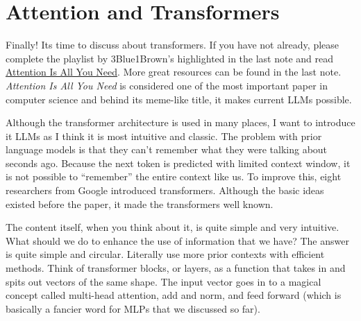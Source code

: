 \documentclass[../../../main.tex]{subfiles}
\begin{document}
\section{Attention and Transformers}

Finally! Its time to discuss about transformers. If you have not
already, please complete the playlist by 3Blue1Brown's highlighted
in the last note and read \href{https://arxiv.org/abs/1706.03762}
{Attention Is All You Need}. More great resources can be found in
the last note. \textit{Attention Is All You Need} is considered one
of the most important paper in computer science and behind its
meme-like title, it makes current LLMs possible.

Although the transformer architecture is used in many places, I want
to introduce it LLMs as I think it is most intuitive and classic.
The problem with prior language models is that they can't remember
what they were talking about seconds ago. Because the next token
is predicted with limited context window, it is not possible to
``remember'' the entire context like us. To improve this, eight
researchers from Google introduced transformers. Although the basic
ideas existed before the paper, it made the transformers well known.

The content itself, when you think about it, is quite simple and
very intuitive. What should we do to enhance the use of information
that we have? The answer is quite simple and circular. Literally use
more prior contexts with efficient methods. Think of transformer
blocks, or layers, as a function that takes in and spits out vectors
of the same shape. The input vector goes in to a magical concept
called multi-head attention, add and norm, and feed forward (which is
basically a fancier word for MLPs that we discussed so far).
\end{document}
